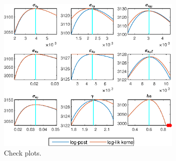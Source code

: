  
\begin{figure}[H]
\centering 
\includegraphics[width=0.80\textwidth]{BRS_growth_KPR/graphs/BRS_growth_KPR_CheckPlots1}
\caption{Check plots.}\label{Fig:CheckPlots:1}
\end{figure}
 
